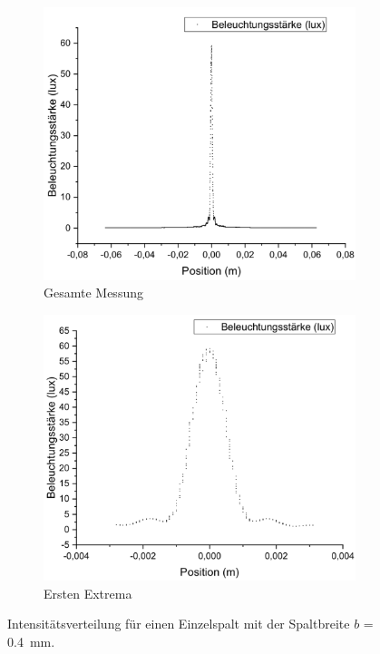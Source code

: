 \documentclass[
	a4paper,
	12pt,
	pagesize,
	ngerman
]{scrartcl}
\begin{document}
	\begin{figure}[H]
		\centering
		\begin{subfigure}{.5\textwidth}
			\centering
			\includegraphics[width=1\linewidth]{Einzelspalt0-400mm}
			\caption{Gesamte Messung}	
		\end{subfigure}%
		\begin{subfigure}{.5\textwidth}
			\centering
			\includegraphics[width=1\linewidth]{Einzelspalt0-400mmZOOM}
			\caption{Ersten Extrema}
		\end{subfigure}
		\label{Einzelspalt0-400mm}
		\caption{Intensitätsverteilung für einen Einzelspalt mit der Spaltbreite $b$ = \SI{0,4}{mm}.}
	\end{figure}
\end{document}
